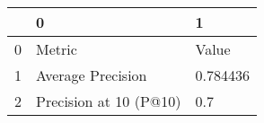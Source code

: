 \begin{tabular}{lll}
\toprule
{} &                       0 &         1 \\
\midrule
0 &                  Metric &     Value \\
1 &       Average Precision &  0.784436 \\
2 &  Precision at 10 (P@10) &       0.7 \\
\bottomrule
\end{tabular}
